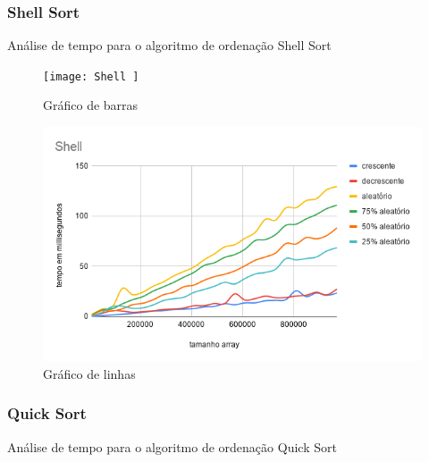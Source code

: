 \documentclass[a4paper, 12pt]{article}
\begin{document}
\subsubsection{Shell Sort}
Análise de tempo para o algoritmo de ordenação Shell Sort
	\begin{figure}[!h]
		\caption{ Gráfico de barras }
		\label{fig:shell1}
		\centering
		\texttt{[image: Shell ]}
	\end{figure}
	\begin{figure}[!h]
	\caption{ Gráfico de linhas }
	\label{fig:shell2}
	\centering
	\includegraphics[width=1\textwidth, height=0.57\textwidth]{Shell_linha}
\end{figure}


	\newpage

\subsubsection{Quick Sort}
Análise de tempo para o algoritmo de ordenação Quick Sort
\end{document}
